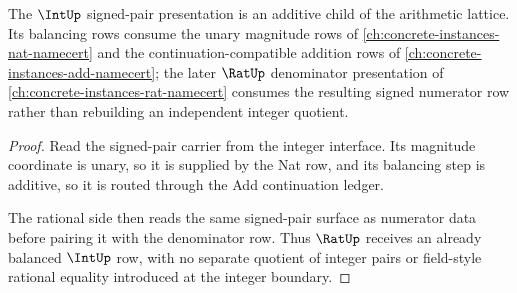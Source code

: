 \begin{theorem}
\label{thm:int-signed-pair-additive-lattice-dependency}
The $\IntUp$ signed-pair presentation is an additive child of the arithmetic lattice. Its balancing rows consume the unary magnitude rows of \autoref{ch:concrete-instances-nat-namecert} and the continuation-compatible addition rows of \autoref{ch:concrete-instances-add-namecert}; the later $\RatUp$ denominator presentation of \autoref{ch:concrete-instances-rat-namecert} consumes the resulting signed numerator row rather than rebuilding an independent integer quotient.
\end{theorem}
\begin{proof}
Read the signed-pair carrier from the integer interface. Its magnitude coordinate is unary, so it is supplied by the Nat row, and its balancing step is additive, so it is routed through the Add continuation ledger.

The rational side then reads the same signed-pair surface as numerator data before pairing it with the denominator row. Thus $\RatUp$ receives an already balanced $\IntUp$ row, with no separate quotient of integer pairs or field-style rational equality introduced at the integer boundary.
\end{proof}
